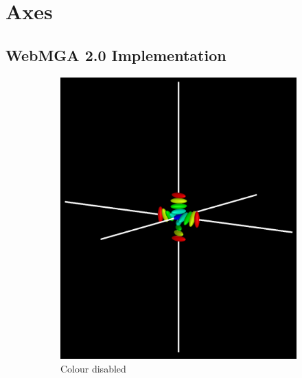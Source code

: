 \section{Axes}

\subsection{WebMGA 2.0 Implementation}
\begin{figure}
  \begin{center}
    \begin{subfigure}{0.4\textwidth}
      \includegraphics[width=\linewidth]{assets/images/axes/2_no_colour}
      \caption{Colour disabled}
      \label{fig:original_axes_no_colour}
    \end{subfigure}
    \begin{subfigure}{0.4\textwidth}

\end{subfigure}
\end{center}
\end{figure}
